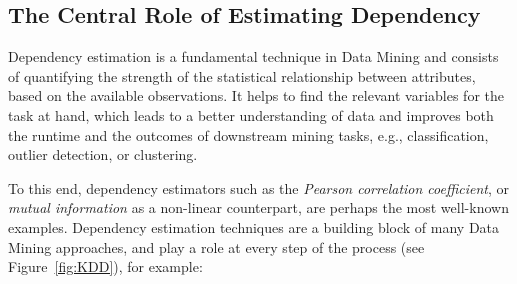 \subsection{The Central Role of Estimating Dependency}
\label{sec:centralrole}

Dependency estimation is a fundamental technique in Data Mining \cite{DBLP:journals/tkde/ChenHY96} and consists of quantifying the strength of the statistical relationship between attributes, based on the available observations. It helps to find the relevant variables for the task at hand, which leads to a better understanding of data and improves both the runtime and the outcomes of downstream mining tasks, e.g., classification, outlier detection, or clustering.

To this end, dependency estimators such as the \textit{Pearson correlation coefficient}, or \textit{mutual information} \cite{DBLP:journals/bstj/Shannon48} as a non-linear counterpart, are perhaps the most well-known examples. Dependency estimation techniques are a building block of many Data Mining approaches, and play a role at every step of the process (see Figure~\ref{fig:KDD}), for example:

